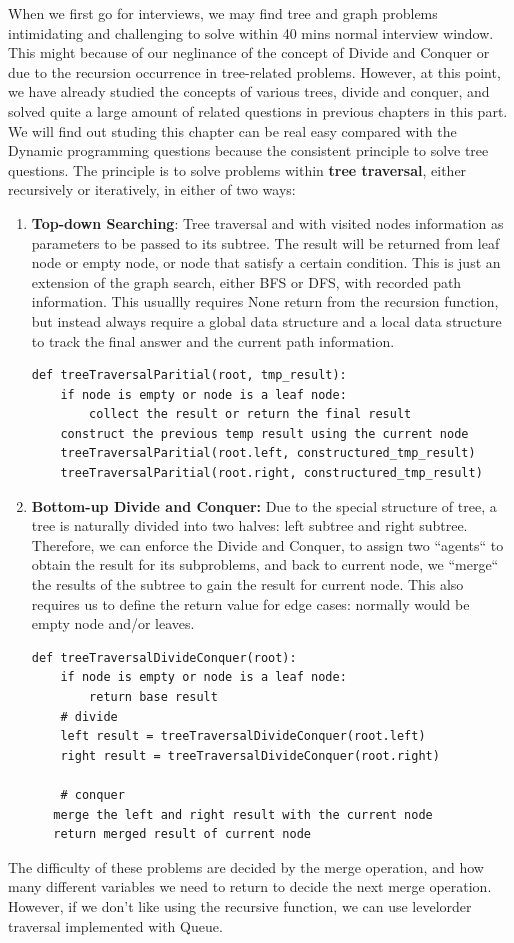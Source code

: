 \documentclass[../main.tex]{subfiles}
\begin{document}
When we first go for interviews, we may find tree and graph problems intimidating and challenging to solve within 40 mins normal interview window. This might because of our neglinance of the concept of Divide and Conquer or due to the recursion occurrence in tree-related problems. However, at this point, we have already studied the concepts of various trees, divide and conquer, and solved quite a large amount of related questions in previous chapters in this part. We will find out studing this chapter can be real easy compared with the Dynamic programming questions because the consistent principle to solve tree questions.  The principle is to solve problems within \textbf{tree traversal}, either recursively or iteratively,  in either of two ways:  
\begin{enumerate}
    \item \textbf{Top-down Searching}: Tree traversal and with visited nodes information as parameters to be passed to its subtree. The result will be returned from leaf node or empty node, or node that satisfy a certain condition. This is just an extension of the graph search, either BFS or DFS, with recorded path information. This usuallly requires None return from the recursion function, but instead always require a global data structure and a local data structure to track the final answer and the current path information. 
\begin{lstlisting}
def treeTraversalParitial(root, tmp_result):
    if node is empty or node is a leaf node:
        collect the result or return the final result
    construct the previous temp result using the current node
    treeTraversalParitial(root.left, constructured_tmp_result)
    treeTraversalParitial(root.right, constructured_tmp_result)
\end{lstlisting}

\item \textbf{Bottom-up Divide and Conquer:} Due to the special structure of tree, a tree is naturally divided into two halves: left subtree and right subtree. Therefore, we can enforce the Divide and Conquer, to assign two ``agents`` to obtain the result for its subproblems, and back to current node, we ``merge`` the results of the subtree to gain the result for current node. This also requires us to define the return value for edge cases: normally would be empty node and/or leaves.  
\begin{lstlisting}
def treeTraversalDivideConquer(root):
    if node is empty or node is a leaf node:
        return base result
    # divide
    left result = treeTraversalDivideConquer(root.left)
    right result = treeTraversalDivideConquer(root.right)
    
    # conquer
   merge the left and right result with the current node
   return merged result of current node
\end{lstlisting}
\end{enumerate}
The difficulty of these problems are decided by the merge operation, and how many different variables we need to return to decide the next merge operation. However, if we don't like using the recursive function, we can use levelorder traversal implemented with Queue.
\end{document}
